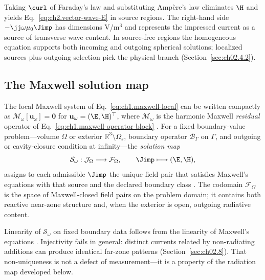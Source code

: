 Taking $\curl$ of Faraday's law and substituting Amp\`ere's law eliminates $\H$ and yields Eq.~\eqref{eq:ch2.vector-wave-E} in source regions. The right-hand side $-\jj\omega\mu_0\Jimp$ has dimensions V/m$^3$ and represents the impressed current as a source of transverse wave content. In source-free regions the homogeneous equation supports both incoming and outgoing spherical solutions; localized sources plus outgoing selection pick the physical branch (Section~\ref{sec:ch02.4.2}).

\subsection{The Maxwell solution map}
\label{sec:ch02.1.2}

The local Maxwell system of Eq.~\eqref{eq:ch1.maxwell-local} can be written compactly as $\mathcal{M}_\omega[\mathbf{u}_\omega]=\mathbf{0}$ for $\mathbf{u}_\omega=(\E,\H)^\top$, where $\mathcal{M}_\omega$ is the harmonic Maxwell \emph{residual} operator of Eq.~\eqref{eq:ch1.maxwell-operator-block} \cite{stratton1941}. For a fixed boundary-value problem---volume $\Omega$ or exterior $\mathbb{R}^3\setminus\Omega_s$, boundary operator $\mathcal{B}_\Gamma$ on $\Gamma$, and outgoing or cavity-closure condition at infinity---the \emph{solution map}
\begin{equation}
\label{eq:ch2.Somega-def}
\mathcal{S}_\omega:\mathcal{J}_\Omega\longrightarrow\mathcal{F}_\Omega,
\qquad
\Jimp\longmapsto (\E,\H),
\end{equation}
assigns to each admissible $\Jimp$ the unique field pair that satisfies Maxwell's equations with that source and the declared boundary class \cite{stratton1941}. The codomain $\mathcal{F}_\Omega$ is the space of Maxwell-closed field pairs on the problem domain; it contains both reactive near-zone structure and, when the exterior is open, outgoing radiative content.

Linearity of $\mathcal{S}_\omega$ on fixed boundary data follows from the linearity of Maxwell's equations \cite{maxwell1873}. Injectivity fails in general: distinct currents related by non-radiating additions can produce identical far-zone patterns (Section~\ref{sec:ch02.8}). That non-uniqueness is not a defect of measurement---it is a property of the radiation map developed below.

